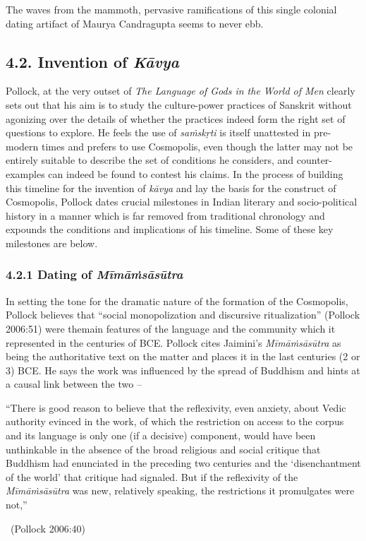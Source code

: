 The waves from the mammoth, pervasive ramifications of this single colonial dating artifact of Maurya Candragupta seems to never ebb.



\subsection*{4.2. Invention of \textit{Kāvya}}

Pollock, at the very outset of \textit{The Language of Gods in the World of Men} clearly sets out that his aim is to study the culture-power practices of Sanskrit without agonizing over the details of whether the practices indeed form the right set of questions to explore. He feels the use of \textit{saṁskṛti} is itself unattested in pre-modern times and prefers to use Cosmopolis, even though the latter may not be entirely suitable to describe the set of conditions he considers, and counter-examples can indeed be found to contest his claims. In the process of building this timeline for the invention of \textit{kāvya} and lay the basis for the construct of Cosmopolis, Pollock dates crucial milestones in Indian literary and socio-political history in a manner which is far removed from traditional chronology and expounds the conditions and implications of his timeline. Some of these key milestones are below.

\vspace{-.4cm}

\subsubsection*{4.2.1 Dating of \textit{Mīmāṁsāsūtra}}

In setting the tone for the dramatic nature of the formation of the Cosmopolis, Pollock believes that “social monopolization and discursive ritualization” (Pollock 2006:51) were themain features of the language and the community which it represented in the centuries of BCE. Pollock cites Jaimini’s \textit{Mīmāṁsāsūtra} as being the authoritative text on the matter and places it in the last centuries (2 or 3) BCE. He says the work was influenced by the spread of Buddhism and hints at a causal link between the two –

\begin{myquote}
“There is good reason to believe that the reflexivity, even anxiety, about Vedic authority evinced in the work, of which the restriction on access to the corpus and its language is only one (if a decisive) component, would have been unthinkable in the absence of the broad religious and social critique that Buddhism had enunciated in the preceding two centuries and the ‘disenchantment of the world’ that critique had signaled. But if the reflexivity of the \textit{Mīmāṁsāsūtra} was new, relatively speaking, the restrictions it promulgates were not,” 

~\hfill (Pollock 2006:40)
\end{myquote}


